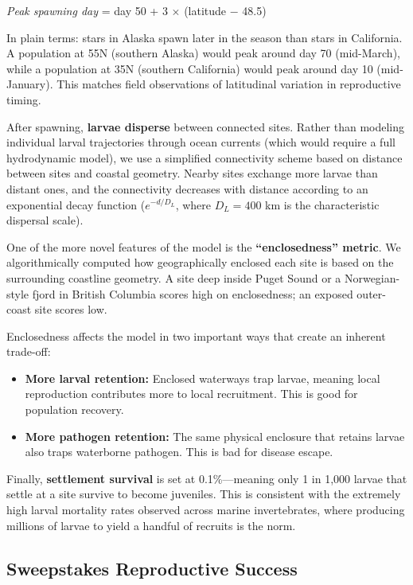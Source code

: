 \documentclass[11pt]{article}
\begin{document}
\begin{center}
\textit{Peak spawning day} = day 50 + 3 $\times$ (latitude $-$ 48.5\textdegree)
\end{center}

In plain terms: stars in Alaska spawn later in the season than stars in California. A population at 55\textdegree N (southern Alaska) would peak around day 70 (mid-March), while a population at 35\textdegree N (southern California) would peak around day 10 (mid-January). This matches field observations of latitudinal variation in reproductive timing.

After spawning, \textbf{larvae disperse} between connected sites. Rather than modeling individual larval trajectories through ocean currents (which would require a full hydrodynamic model), we use a simplified connectivity scheme based on distance between sites and coastal geometry. Nearby sites exchange more larvae than distant ones, and the connectivity decreases with distance according to an exponential decay function ($e^{-d/D_L}$, where $D_L = 400$ km is the characteristic dispersal scale).

One of the more novel features of the model is the \textbf{``enclosedness'' metric}. We algorithmically computed how geographically enclosed each site is based on the surrounding coastline geometry. A site deep inside Puget Sound or a Norwegian-style fjord in British Columbia scores high on enclosedness; an exposed outer-coast site scores low.

Enclosedness affects the model in two important ways that create an inherent trade-off:
\begin{itemize}[leftmargin=2em]
    \item \textbf{More larval retention:} Enclosed waterways trap larvae, meaning local reproduction contributes more to local recruitment. This is good for population recovery.
    \item \textbf{More pathogen retention:} The same physical enclosure that retains larvae also traps waterborne pathogen. This is bad for disease escape.
\end{itemize}

Finally, \textbf{settlement survival} is set at 0.1\%---meaning only 1 in 1,000 larvae that settle at a site survive to become juveniles. This is consistent with the extremely high larval mortality rates observed across marine invertebrates, where producing millions of larvae to yield a handful of recruits is the norm.

\subsection{Sweepstakes Reproductive Success}
\end{document}

